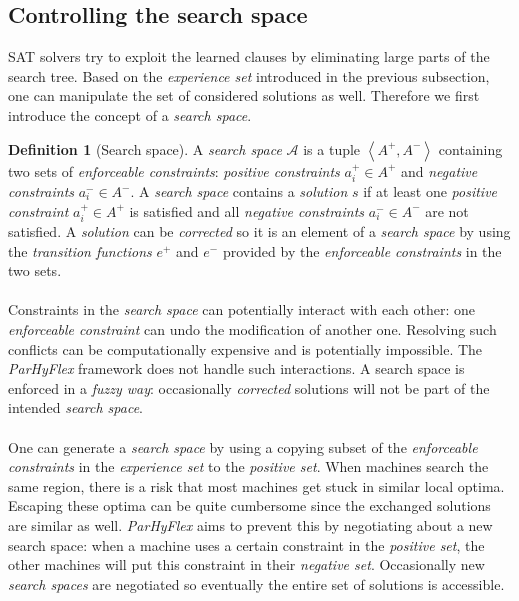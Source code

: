\documentclass[a4paper,10pt]{article}
\newcommand{\seclab}[1]{\label{sec:#1}}
\newcommand{\tupl}[1]{\ensuremath{\left\langle #1 \right\rangle}}
\newcommand{\calA}{\ensuremath{\mathcal{A}}}
\theoremstyle{definition}
\newtheorem{definition}{Definition}
\begin{document}
\subsection{Controlling the search space}
\seclab{controllingsearchspace}
SAT solvers try to exploit the learned clauses by eliminating large parts of the search tree. Based on the \emph{experience set} introduced in the previous subsection, one can manipulate the set of considered solutions as well. Therefore we first introduce the concept of a \emph{search space}.
\begin{definition}[Search space]
A \emph{search space} $\calA$ is a tuple $\tupl{A^+,A^-}$ containing two sets of \emph{enforceable constraints}: \emph{positive constraints} $a^+_i\in A^+$ and \emph{negative constraints} $a^-_i\in A^-$. A \emph{search space} contains a \emph{solution} $s$ if at least one \emph{positive constraint} $a^+_i\in A^+$ is satisfied and all \emph{negative constraints} $a^-_i\in A^-$ are not satisfied. A \emph{solution} can be \emph{corrected} so it is an element of a \emph{search space} by using the \emph{transition functions} $e^+$ and $e^-$ provided by the \emph{enforceable constraints} in the two sets.%
\end{definition}
\paragraph{}
Constraints in the \emph{search space} can potentially interact with each other: one \emph{enforceable constraint} can undo the modification of another one. Resolving such conflicts can be computationally expensive and is potentially impossible. The \emph{ParHyFlex} framework does not handle such interactions. A search space is enforced in a \emph{fuzzy way}: occasionally \emph{corrected} solutions will not be part of the intended \emph{search space}.

\paragraph{}
One can generate a \emph{search space} by using a copying subset of the \emph{enforceable constraints} in the \emph{experience set} to the \emph{positive set}. When machines search the same region, there is a risk that most machines get stuck in similar local optima. Escaping these optima can be quite cumbersome since the exchanged solutions are similar as well. \emph{ParHyFlex} aims to prevent this by negotiating about a new search space: when a machine uses a certain constraint in the \emph{positive set}, the other machines will put this constraint in their \emph{negative set}. Occasionally new \emph{search spaces} are negotiated so eventually the entire set of solutions is accessible.
\end{document}
